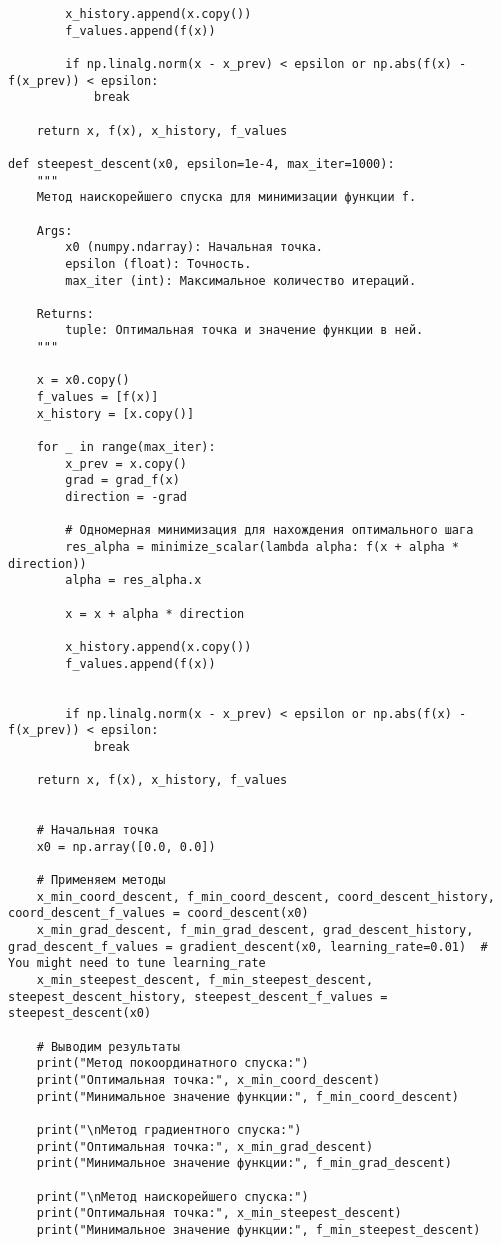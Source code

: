 \documentclass{article}
\begin{document}
\begin{lstlisting}
        x_history.append(x.copy())
        f_values.append(f(x))

        if np.linalg.norm(x - x_prev) < epsilon or np.abs(f(x) - f(x_prev)) < epsilon:
            break

    return x, f(x), x_history, f_values

def steepest_descent(x0, epsilon=1e-4, max_iter=1000):
    """
    Метод наискорейшего спуска для минимизации функции f.

    Args:
        x0 (numpy.ndarray): Начальная точка.
        epsilon (float): Точность.
        max_iter (int): Максимальное количество итераций.

    Returns:
        tuple: Оптимальная точка и значение функции в ней.
    """

    x = x0.copy()
    f_values = [f(x)]
    x_history = [x.copy()]

    for _ in range(max_iter):
        x_prev = x.copy()
        grad = grad_f(x)
        direction = -grad

        # Одномерная минимизация для нахождения оптимального шага
        res_alpha = minimize_scalar(lambda alpha: f(x + alpha * direction))
        alpha = res_alpha.x

        x = x + alpha * direction
        
        x_history.append(x.copy())
        f_values.append(f(x))


        if np.linalg.norm(x - x_prev) < epsilon or np.abs(f(x) - f(x_prev)) < epsilon:
            break

    return x, f(x), x_history, f_values


    # Начальная точка
    x0 = np.array([0.0, 0.0])

    # Применяем методы
    x_min_coord_descent, f_min_coord_descent, coord_descent_history, coord_descent_f_values = coord_descent(x0)
    x_min_grad_descent, f_min_grad_descent, grad_descent_history, grad_descent_f_values = gradient_descent(x0, learning_rate=0.01)  # You might need to tune learning_rate
    x_min_steepest_descent, f_min_steepest_descent, steepest_descent_history, steepest_descent_f_values = steepest_descent(x0)

    # Выводим результаты
    print("Метод покоординатного спуска:")
    print("Оптимальная точка:", x_min_coord_descent)
    print("Минимальное значение функции:", f_min_coord_descent)

    print("\nМетод градиентного спуска:")
    print("Оптимальная точка:", x_min_grad_descent)
    print("Минимальное значение функции:", f_min_grad_descent)

    print("\nМетод наискорейшего спуска:")
    print("Оптимальная точка:", x_min_steepest_descent)
    print("Минимальное значение функции:", f_min_steepest_descent)
\end{lstlisting}
\end{document}
